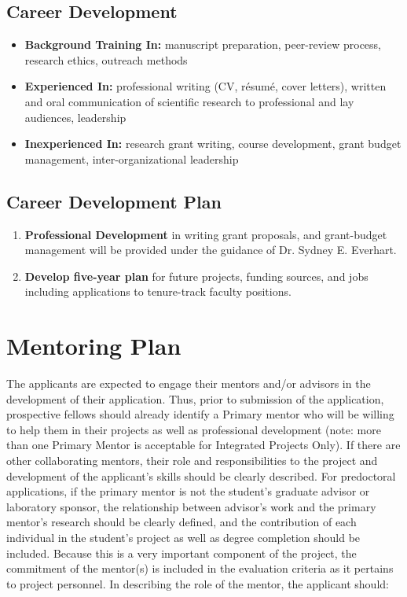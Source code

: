 \documentclass[12pt,letterpaper]{article}
\begin{document}
\subsection{Career Development}

\begin{itemize}
  \item \textbf{Background Training In:} 
  manuscript preparation, peer-review process, research ethics, outreach methods
  \item \textbf{Experienced In:} 
  professional writing (CV, r\'esum\'e, cover letters), written and oral communication of scientific research to professional and lay audiences, leadership
  \item \textbf{Inexperienced In:} research grant writing, course development, grant budget management, inter-organizational leadership
\end{itemize}

\subsection{Career Development Plan}

\begin{enumerate}
  \item \textbf{Professional Development} in writing grant proposals, and grant-budget management will be provided under the guidance of Dr. Sydney E. Everhart.
  \item \textbf{Develop five-year plan} for future projects, funding sources, and jobs including applications to tenure-track faculty positions.  
\end{enumerate}



\section{Mentoring Plan}

The applicants are expected to engage their mentors and/or advisors in the
development of their application. Thus, prior to submission of the
application, prospective fellows should already identify a Primary mentor who
will be willing to help them in their projects as well as professional
development (note: more than one Primary Mentor is acceptable for Integrated
Projects Only). If there are other collaborating mentors, their role and
responsibilities to the project and development of the applicant's skills
should be clearly described. For predoctoral applications, if the primary
mentor is not the student's graduate advisor or laboratory sponsor, the
relationship between advisor's work and the primary mentor's research should
be clearly defined, and the contribution of each individual in the student's
project as well as degree completion should be included. Because this is a
very important component of the project, the commitment of the mentor(s) is
included in the evaluation criteria as it pertains to project personnel. In
describing the role of the mentor, the applicant should:
\end{document}
